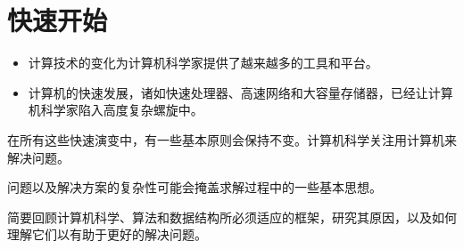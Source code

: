 \section{快速开始}

\begin{frame}\ft{\secname}
  \begin{itemize}
  \item 计算技术的变化为计算机科学家提供了越来越多的工具和平台。
  \item 计算机的快速发展，诸如快速处理器、高速网络和大容量存储器，已经让计算机科学家陷入高度复杂螺旋中。
  \end{itemize}

  在所有这些快速演变中，有一些基本原则会保持不变。计算机科学关注用计算机来解决问题。
\end{frame}


\begin{frame}\ft{\secname}
  问题以及解决方案的复杂性可能会掩盖求解过程中的一些基本思想。
\end{frame}


\begin{frame}\ft{\secname}


简要回顾计算机科学、算法和数据结构所必须适应的框架，研究其原因，以及如何理解它们以有助于更好的解决问题。
\end{frame}

